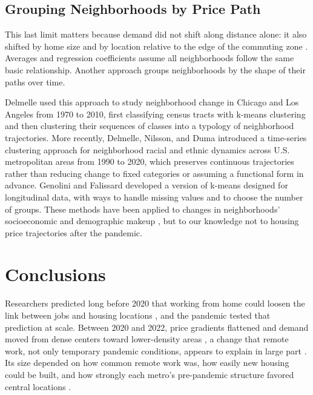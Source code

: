 \documentclass[11pt]{article}
\begin{document}
\subsection{Grouping Neighborhoods by Price Path}

This last limit matters because demand did not shift along distance alone: it also shifted by home size \cite{mondragon2022housing} and by location relative to the edge of the commuting zone \cite{ahrend2023expanding}. Averages and regression coefficients assume all neighborhoods follow the same basic relationship. Another approach groups neighborhoods by the shape of their paths over time.

Delmelle \cite{delmelle2016mapping} used this approach to study neighborhood change in Chicago and Los Angeles from 1970 to 2010, first classifying census tracts with k-means clustering and then clustering their sequences of classes into a typology of neighborhood trajectories. More recently, Delmelle, Nilsson, and Duma \cite{delmelle2025time} introduced a time-series clustering approach for neighborhood racial and ethnic dynamics across U.S. metropolitan areas from 1990 to 2020, which preserves continuous trajectories rather than reducing change to fixed categories or assuming a functional form in advance. Genolini and Falissard \cite{genolini2010kml} developed a version of k-means designed for longitudinal data, with ways to handle missing values and to choose the number of groups. These methods have been applied to changes in neighborhoods' socioeconomic and demographic makeup \cite{delmelle2016mapping,delmelle2025time}, but to our knowledge not to housing price trajectories after the pandemic.

\section{Conclusions}

Researchers predicted long before 2020 that working from home could loosen the link between jobs and housing locations \cite{lund1994telecommuting,mokhtarian2004telecommuting,brueckner2023spatial}, and the pandemic tested that prediction at scale. Between 2020 and 2022, price gradients flattened \cite{brueckner2023spatial,gupta2022flattening} and demand moved from dense centers toward lower-density areas \cite{ramani2021donut,ahrend2023expanding}, a change that remote work, not only temporary pandemic conditions, appears to explain in large part \cite{gupta2022flattening,mondragon2022housing}. Its size depended on how common remote work was, how easily new housing could be built, and how strongly each metro's pre-pandemic structure favored central locations \cite{ramani2021donut,gupta2022flattening,howard2023short}.
\end{document}

